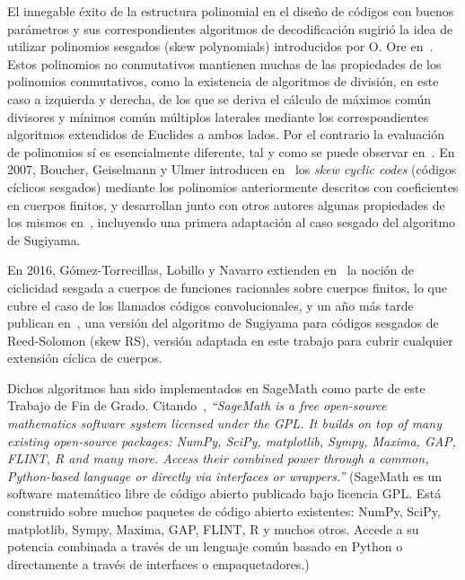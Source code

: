 El innegable éxito de la estructura polinomial en el diseño de códigos con buenos parámetros y sus correspondientes algoritmos de decodificación sugirió la idea de utilizar polinomios sesgados (skew polynomials) introducidos por O. Ore en~\cite{Ore_1933}. Estos polinomios no conmutativos mantienen muchas de las propiedades de los polinomios conmutativos, como la existencia de algoritmos de división, en este caso a izquierda y derecha, de los que se deriva el cálculo de máximos común divisores y mínimos común múltiplos laterales mediante los correspondientes algoritmos extendidos de Euclides a ambos lados. Por el contrario la evaluación de polinomios sí es esencialmente diferente, tal y como se puede observar en~\cite{lam_vandermonde_1988,Leroy_1995}. En 2007, Boucher, Geiselmann y Ulmer introducen en~\cite{boucher2007skew} los \emph{skew cyclic codes} (códigos cíclicos sesgados) mediante los polinomios anteriormente descritos con coeficientes en cuerpos finitos, y desarrollan junto con otros autores algunas propiedades de los mismos en~\cite{boucher2009codes,boucher2009coding,chaussade2009skew}, incluyendo una primera adaptación al caso sesgado del algoritmo de Sugiyama.

En 2016, Gómez-Torrecillas, Lobillo y Navarro extienden en~\cite{gomez-torrecillas_new_2016} la noción de ciclicidad sesgada a cuerpos de funciones racionales sobre cuerpos finitos, lo que cubre el caso de los llamados códigos convolucionales, y un año más tarde publican en~\cite{gomez-torrecillas_sugiyama_2016}, una versión del algoritmo de Sugiyama para códigos sesgados de Reed-Solomon (skew RS), versión adaptada en este trabajo para cubrir cualquier extensión cíclica de cuerpos.

Dichos algoritmos han sido implementados en SageMath como parte de este Trabajo de Fin de Grado. Citando~\cite{sagemath}, \emph{``SageMath is a free open-source mathematics software system licensed under the GPL. It builds on top of many existing open-source packages: NumPy, SciPy, matplotlib, Sympy, Maxima, GAP, FLINT, R and many more. Access their combined power through a common, Python-based language or directly via interfaces or wrappers.''} (SageMath es un software matemático libre de código abierto publicado bajo licencia GPL. Está construido sobre muchos paquetes de código abierto existentes: NumPy, SciPy, matplotlib, Sympy, Maxima, GAP, FLINT, R y muchos otros. Accede a su potencia combinada a través de un lenguaje común basado en Python o directamente a través de interfaces o empaquetadores.)

\endinput
